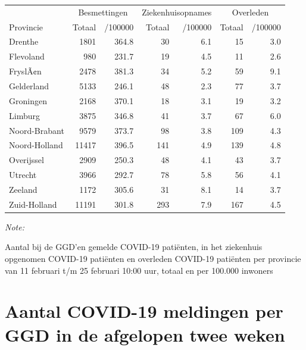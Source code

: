 \documentclass[
  english,
  man,floatsintext]{apa6}
\begin{document}
\begin{table}[H]
\centering
\begin{threeparttable}
\begin{tabular}{lrrrrrr}
\toprule
\multicolumn{1}{c}{ } & \multicolumn{2}{c}{Besmettingen} & \multicolumn{2}{c}{Ziekenhuisopnames} & \multicolumn{2}{c}{Overleden} \\
\cmidrule(l{3pt}r{3pt}){2-3} \cmidrule(l{3pt}r{3pt}){4-5} \cmidrule(l{3pt}r{3pt}){6-7}
Provincie & Totaal & /100000 & Totaal & /100000 & Totaal & /100000\\
\midrule
Drenthe & 1801 & 364.8 & 30 & 6.1 & 15 & 3.0\\
Flevoland & 980 & 231.7 & 19 & 4.5 & 11 & 2.6\\
FryslÃ¢n & 2478 & 381.3 & 34 & 5.2 & 59 & 9.1\\
Gelderland & 5133 & 246.1 & 48 & 2.3 & 77 & 3.7\\
Groningen & 2168 & 370.1 & 18 & 3.1 & 19 & 3.2\\
Limburg & 3875 & 346.8 & 41 & 3.7 & 67 & 6.0\\
Noord-Brabant & 9579 & 373.7 & 98 & 3.8 & 109 & 4.3\\
Noord-Holland & 11417 & 396.5 & 141 & 4.9 & 139 & 4.8\\
Overijssel & 2909 & 250.3 & 48 & 4.1 & 43 & 3.7\\
Utrecht & 3966 & 292.7 & 78 & 5.8 & 56 & 4.1\\
Zeeland & 1172 & 305.6 & 31 & 8.1 & 14 & 3.7\\
Zuid-Holland & 11191 & 301.8 & 293 & 7.9 & 167 & 4.5\\
\bottomrule
\end{tabular}
\begin{tablenotes}
\item \textit{Note: } 
\item Aantal bij de GGD’en gemelde COVID-19 patiënten, in het ziekenhuis opgenomen COVID-19 patiënten en overleden COVID-19 patiënten per provincie van 11 februari t/m 25 februari 10:00 uur, totaal en per 100.000 inwoners
\end{tablenotes}
\end{threeparttable}
\end{table}

\newpage

\hypertarget{aantal-covid-19-meldingen-per-ggd-in-de-afgelopen-twee-weken}{%
\section{Aantal COVID-19 meldingen per GGD in de afgelopen twee weken}\label{aantal-covid-19-meldingen-per-ggd-in-de-afgelopen-twee-weken}}
\end{document}
